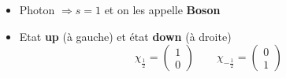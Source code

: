\begin{itemize}
	\item Photon $\Rightarrow s = 1$ et on les appelle \textbf{Boson}
	
	\item Etat \textbf{up} (à gauche) et état \textbf{down} (à droite)
		\begin{equation}
			\chi _{\frac{1}{2}} = 
			\left(
			\begin{array}{c}
			1 \\ 
			0
			\end{array}
			\right) 
			\qquad
			\chi _{-\frac{1}{2}} =
			\left(						
			\begin{array}{c}
			0 \\ 
			1
			\end{array} 
			\right)		
		\end{equation}
		
\end{itemize}